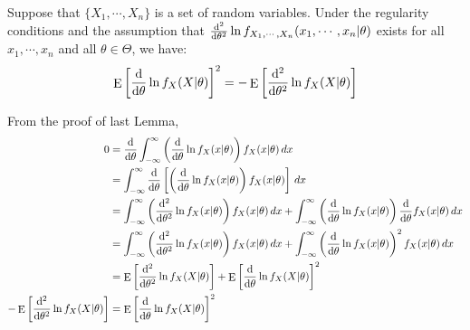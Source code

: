 \documentclass{huhtakm-template-book-v2}
\DeclareMathOperator{\E}{E}
\begin{document}
\begin{lem}
	\label{Chapter 2 (Lemma) Relationship between expectation of l'' and I}
	Suppose that $\{X_{1},\cdots,X_{n}\}$ is a set of random variables. Under the regularity conditions and the assumption that $\odv*[order={2}]{}{\theta}\ln{f_{X_{1},\cdots,X_{n}}(x_{1},\cdots,x_{n}|\theta)}$ exists for all $x_{1},\cdots,x_{n}$ and all $\theta\in\Theta$, we have:
	\begin{equation*}
		\E\left[\odv*{}{\theta}\ln{f_{X}(X|\theta)}\right]^{2}=-\E\left[\odv*[order={2}]{}{\theta}\ln{f_{X}(X|\theta)}\right]
	\end{equation*}
\end{lem}
\begin{proofing}
	From the proof of last Lemma,
	\begin{align*}
		0&=\odv*{}{\theta}\intinfty\left(\odv*{}{\theta}\ln{f_{X}(x|\theta)}\right)f_{X}(x|\theta)\,dx\\
		&=\intinfty\odv*{}{\theta}\left[\left(\odv*{}{\theta}\ln{f_{X}(x|\theta)}\right)f_{X}(x|\theta)\right]\,dx\\
		&=\intinfty\left(\odv*[order=2]{}{\theta}\ln{f_{X}(x|\theta)}\right)f_{X}(x|\theta)\,dx+\intinfty\left(\odv*{}{\theta}\ln{f_{X}(x|\theta)}\right)\odv*{}{\theta}f_{X}(x|\theta)\,dx\\
		&=\intinfty\left(\odv*[order=2]{}{\theta}\ln{f_{X}(x|\theta)}\right)f_{X}(x|\theta)\,dx+\intinfty\left(\odv*{}{\theta}\ln{f_{X}(x|\theta)}\right)^{2}f_{X}(x|\theta)\,dx\\
		&=\E\left[\odv*[order={2}]{}{\theta}\ln{f_{X}(X|\theta)}\right]+\E\left[\odv*{}{\theta}\ln{f_{X}(X|\theta)}\right]^{2}\\
		-\E\left[\odv*[order={2}]{}{\theta}\ln{f_{X}(X|\theta)}\right]&=\E\left[\odv*{}{\theta}\ln{f_{X}(X|\theta)}\right]^{2}
	\end{align*}
\end{proofing}
\end{document}
